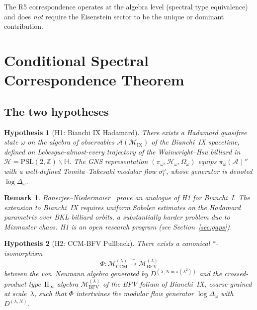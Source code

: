 \documentclass[11pt]{article}
\newtheorem{remark}[theorem]{Remark}
\newtheorem{hypothesis}{Hypothesis}
\newcommand{\IX}{\mathrm{IX}}
\newcommand{\CCM}{\mathrm{CCM}}
\newcommand{\BFV}{\mathrm{BFV}}
\newcommand{\PSL}{\mathrm{PSL}}
\newcommand{\Lam}{\lambda}
\newcommand{\II}{\mathrm{II}_\infty}
\begin{document}
The R5 correspondence operates at the algebra level (spectral type
equivalence) and does \emph{not} require the Eisenstein sector to be
the unique or dominant contribution.

\section{Conditional Spectral Correspondence Theorem}
\label{sec:main}

\subsection{The two hypotheses}

\begin{hypothesis}[H1: Bianchi IX Hadamard]
\label{hyp:H1}
There exists a Hadamard quasifree state $\omega$ on the algebra of
observables $\mathcal{A}(\mathcal{M}_\IX)$ of the Bianchi~IX spacetime,
defined on Lebesgue-almost-every trajectory of the Wainwright--Hsu
billiard in $\mathcal{H} = \PSL(2,\mathbb{Z})\backslash\mathbb{H}$.
The GNS representation $(\pi_\omega, \mathcal{H}_\omega, \Omega_\omega)$
equips $\pi_\omega(\mathcal{A})''$ with a well-defined Tomita--Takesaki
modular flow $\sigma_t^\omega$, whose generator is denoted $\log\Delta_\omega$.
\end{hypothesis}

\begin{remark}
Banerjee--Niedermaier~\cite{BN2023} prove an analogue of H1 for
Bianchi~I. The extension to Bianchi~IX requires uniform Sobolev
estimates on the Hadamard parametrix over BKL billiard orbits, a
substantially harder problem due to Mixmaster chaos. H1 is an open
research program (see Section~\ref{sec:gaps}).
\end{remark}

\begin{hypothesis}[H2: CCM-BFV Pullback]
\label{hyp:H2}
There exists a canonical $*$-isomorphism
\begin{equation}
  \Phi: \mathcal{M}_\CCM^{(\Lam)} \xrightarrow{\;\sim\;}
        \mathcal{M}_\BFV^{(\Lam)}
\end{equation}
between the von~Neumann algebra generated by $D^{(\Lam,N=\pi(\Lam^2))}$
and the crossed-product type~$\II$ algebra $\mathcal{M}_\BFV^{(\Lam)}$
of the BFV folium of Bianchi~IX, coarse-grained at scale~$\Lam$,
such that $\Phi$ intertwines the modular flow generator
$\log\Delta_\omega$ with $D^{(\Lam,N)}$.
\end{hypothesis}
\end{document}
